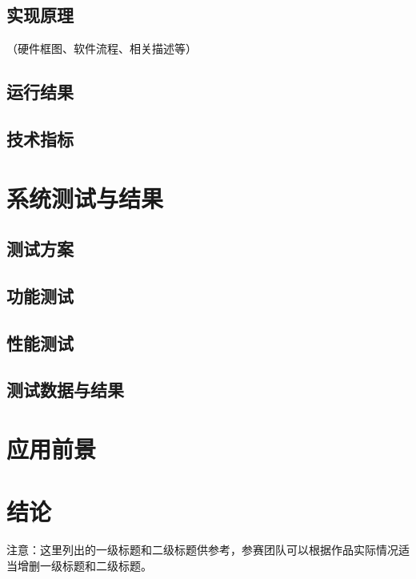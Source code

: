 \documentclass[UTF8,a4paper,zihao=-4,fontset=none]{ctexart}
\numberwithin{algorithm}{section}
\newcommand{\templategap}{\mbox{}\par\vspace{0.1cm}}
\begin{document}
\subsection{实现原理}
（硬件框图、软件流程、相关描述等）
\mbox{}\par\vspace{0.7cm}

\subsection{运行结果}
\templategap

\subsection{技术指标}
\templategap

\section{系统测试与结果}
\templategap

\subsection{测试方案}
\templategap

\subsection{功能测试}
\templategap

\clearpage
\subsection{性能测试}
\templategap

\subsection{测试数据与结果}
\templategap

\section{应用前景}
\templategap

\section{结论}
\vspace{1.9cm}

{\fontsize{12pt}{24pt}\selectfont
注意：这里列出的一级标题和二级标题供参考，参赛团队可以根据作品实际情况适当增删一级标题和二级标题。}
\end{document}
